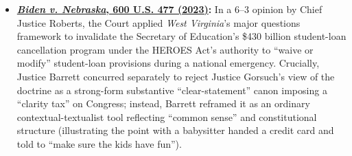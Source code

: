 \documentclass[12pt]{article}
\begin{document}
\begin{itemize}

\item \textbf{\href{https://supreme.justia.com/cases/federal/us/600/22-506/}{\textit{Biden v. Nebraska}, 600 U.S. 477 (2023)}:} In a 6--3 opinion by Chief Justice Roberts, the Court applied \textit{West Virginia}'s major questions framework to invalidate the Secretary of Education's \$430 billion student-loan cancellation program under the HEROES Act's authority to ``waive or modify'' student-loan provisions during a national emergency. Crucially, Justice Barrett concurred separately to reject Justice Gorsuch's view of the doctrine as a strong-form substantive ``clear-statement'' canon imposing a ``clarity tax'' on Congress; instead, Barrett reframed it as an ordinary contextual-textualist tool reflecting ``common sense'' and constitutional structure (illustrating the point with a babysitter handed a credit card and told to ``make sure the kids have fun'').


\end{itemize}
\end{document}
